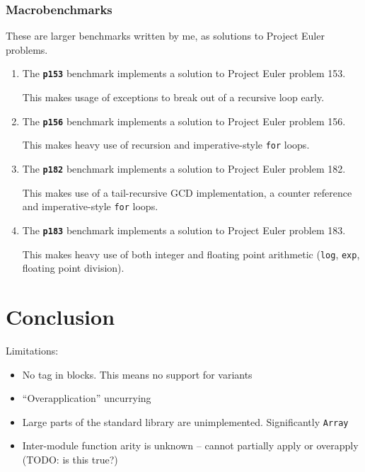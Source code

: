 \documentclass[12pt,a4paper,twoside,openright]{report}
\begin{document}
\subsection{Macrobenchmarks}
These are larger benchmarks written by me, as solutions to Project Euler problems.

\begin{enumerate}
\item

The \textbf{\texttt{p153}} benchmark implements a solution to Project Euler problem 153.

This makes usage of exceptions to break out of a recursive loop early.

\item
  The \textbf{\texttt{p156}} benchmark implements a solution to Project Euler problem 156.

This makes heavy use of recursion and imperative-style \lstinline!for! loops.

\item
  The \textbf{\texttt{p182}} benchmark implements a solution to Project Euler problem 182.

This makes use of a tail-recursive GCD implementation, a counter reference and imperative-style \lstinline!for! loops.

\item
  The \textbf{\texttt{p183}} benchmark implements a solution to Project Euler problem 183.

This makes heavy use of both integer and floating point arithmetic (\lstinline!log!, \lstinline!exp!, floating point division).
\end{enumerate}

\chapter{Conclusion}\label{conclusion}

Limitations:

\begin{itemize}
  \item No tag in blocks. This means no support for variants
  \item ``Overapplication'' uncurrying
  \item Large parts of the standard library are unimplemented. Significantly \lstinline!Array!
  \item Inter-module function arity is unknown -- cannot partially apply or overapply (TODO: is this true?)
\end{itemize}
\end{document}
